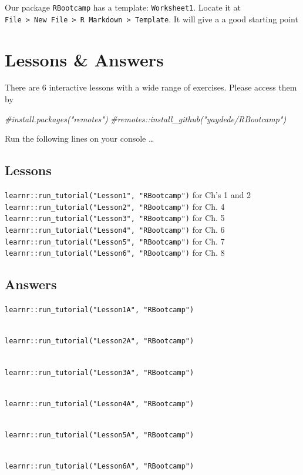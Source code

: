 \documentclass[
]{book}
\newenvironment{Shaded}{\begin{snugshade}}{\end{snugshade}}
\newcommand{\CommentTok}[1]{\textcolor[rgb]{0.56,0.35,0.01}{\textit{#1}}}
\begin{document}
Our package \texttt{RBootcamp} has a template: \texttt{Worksheet1}. Locate it at \texttt{File\ \textgreater{}\ New\ File\ \textgreater{}\ R\ Markdown\ \textgreater{}\ Template}. It will give a a good starting point

\hypertarget{lessons-answers}{%
\chapter{Lessons \& Answers}\label{lessons-answers}}

There are 6 interactive lessons with a wide range of exercises. Please access them by

\begin{Shaded}
\begin{Highlighting}[]
\CommentTok{\#install.packages("remotes")}
\CommentTok{\#remotes::install\_github("yaydede/RBootcamp")}
\end{Highlighting}
\end{Shaded}

Run the following lines on your console \ldots{}

\hypertarget{lessons}{%
\section{Lessons}\label{lessons}}

\texttt{learnr::run\_tutorial("Lesson1",\ "RBootcamp")} for Ch's 1 and 2\\
\texttt{learnr::run\_tutorial("Lesson2",\ "RBootcamp")} for Ch. 4\\
\texttt{learnr::run\_tutorial("Lesson3",\ "RBootcamp")} for Ch. 5\\
\texttt{learnr::run\_tutorial("Lesson4",\ "RBootcamp")} for Ch. 6\\
\texttt{learnr::run\_tutorial("Lesson5",\ "RBootcamp")} for Ch. 7\\
\texttt{learnr::run\_tutorial("Lesson6",\ "RBootcamp")} for Ch. 8

\hypertarget{answers}{%
\section{Answers}\label{answers}}

\texttt{learnr::run\_tutorial("Lesson1A",\ "RBootcamp")}\strut \\
\texttt{learnr::run\_tutorial("Lesson2A",\ "RBootcamp")}\strut \\
\texttt{learnr::run\_tutorial("Lesson3A",\ "RBootcamp")}\strut \\
\texttt{learnr::run\_tutorial("Lesson4A",\ "RBootcamp")}\strut \\
\texttt{learnr::run\_tutorial("Lesson5A",\ "RBootcamp")}\strut \\
\texttt{learnr::run\_tutorial("Lesson6A",\ "RBootcamp")}

  
\end{document}
